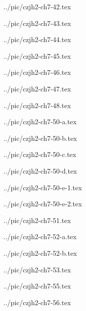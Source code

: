 ../pic/czjh2-ch7-42.tex



../pic/czjh2-ch7-43.tex



../pic/czjh2-ch7-44.tex



../pic/czjh2-ch7-45.tex



../pic/czjh2-ch7-46.tex



../pic/czjh2-ch7-47.tex



../pic/czjh2-ch7-48.tex



../pic/czjh2-ch7-50-a.tex



../pic/czjh2-ch7-50-b.tex



../pic/czjh2-ch7-50-c.tex



../pic/czjh2-ch7-50-d.tex



../pic/czjh2-ch7-50-e-1.tex



../pic/czjh2-ch7-50-e-2.tex



../pic/czjh2-ch7-51.tex



../pic/czjh2-ch7-52-a.tex



../pic/czjh2-ch7-52-b.tex



../pic/czjh2-ch7-53.tex



../pic/czjh2-ch7-55.tex



../pic/czjh2-ch7-56.tex



